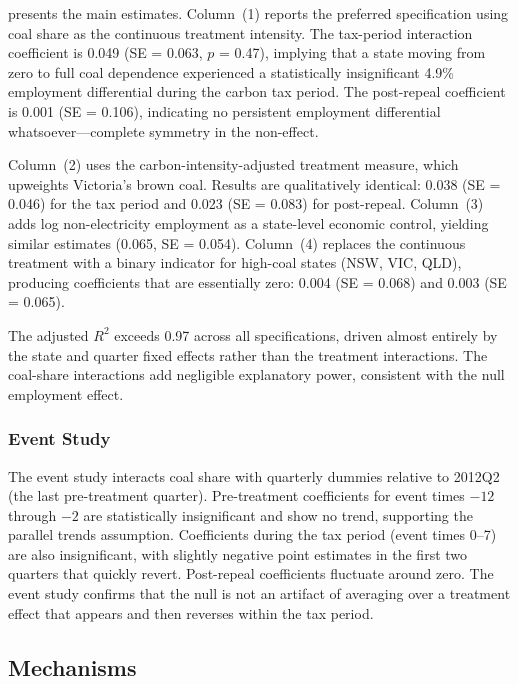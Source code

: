 \documentclass[12pt]{article}
\begin{document}
 presents the main estimates. Column~(1) reports the preferred specification using coal share as the continuous treatment intensity. The tax-period interaction coefficient is 0.049 (SE = 0.063, $p$ = 0.47), implying that a state moving from zero to full coal dependence experienced a statistically insignificant 4.9\% employment differential during the carbon tax period. The post-repeal coefficient is 0.001 (SE = 0.106), indicating no persistent employment differential whatsoever---complete symmetry in the non-effect.

Column~(2) uses the carbon-intensity-adjusted treatment measure, which upweights Victoria's brown coal. Results are qualitatively identical: 0.038 (SE = 0.046) for the tax period and 0.023 (SE = 0.083) for post-repeal. Column~(3) adds log non-electricity employment as a state-level economic control, yielding similar estimates (0.065, SE = 0.054). Column~(4) replaces the continuous treatment with a binary indicator for high-coal states (NSW, VIC, QLD), producing coefficients that are essentially zero: 0.004 (SE = 0.068) and 0.003 (SE = 0.065).

The adjusted $R^2$ exceeds 0.97 across all specifications, driven almost entirely by the state and quarter fixed effects rather than the treatment interactions. The coal-share interactions add negligible explanatory power, consistent with the null employment effect.



\subsubsection*{Event Study} The event study interacts coal share with quarterly dummies relative to 2012Q2 (the last pre-treatment quarter). Pre-treatment coefficients for event times $-12$ through $-2$ are statistically insignificant and show no trend, supporting the parallel trends assumption. Coefficients during the tax period (event times 0--7) are also insignificant, with slightly negative point estimates in the first two quarters that quickly revert. Post-repeal coefficients fluctuate around zero. The event study confirms that the null is not an artifact of averaging over a treatment effect that appears and then reverses within the tax period.

\subsection{Mechanisms}
\end{document}
